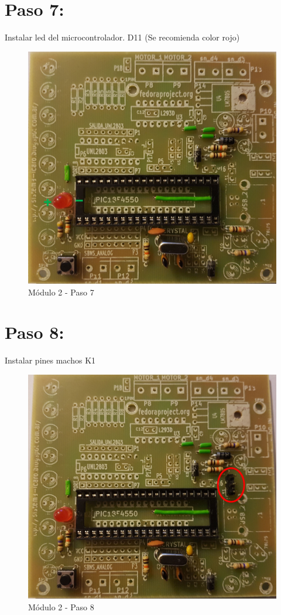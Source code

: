 \newpage

\section{Paso 7:}

Instalar led del microcontrolador. D11 (Se recomienda color rojo)

\begin{figure}[h]
	\centering
	\includegraphics[width=0.8\linewidth]{Modulo_2/M2_7}
	\caption{Módulo 2 - Paso 7}
	\label{fig:M2_7}
\end{figure}

\newpage

\section{Paso 8:}

Instalar pines machos K1

\begin{figure}[h]
	\centering
	\includegraphics[width=0.8\linewidth]{Modulo_2/M2_8}
	\caption{Módulo 2 - Paso 8}
	\label{fig:M2_8}
\end{figure}

